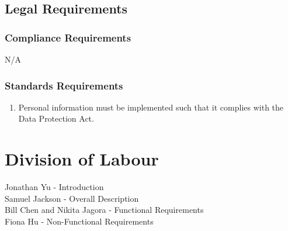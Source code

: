 \documentclass[]{article}
\begin{document}

\subsection{Legal Requirements}
\label{sub:legal_requirements}

\subsubsection{Compliance Requirements}
\label{ssub:compliance_requirements}
N/A

\subsubsection{Standards Requirements}
\label{ssub:standards_requirements}
\begin{enumerate}[{LR}1. ]
	\item Personal information must be implemented such that it complies with the Data Protection Act.
\end{enumerate}


\appendix
\section{Division of Labour}

Jonathan Yu - Introduction \\
Samuel Jackson - Overall Description \\Bill Chen and Nikita Jagora - Functional Requirements\\Fiona Hu - Non-Functional Requirements\\
\end{document}
